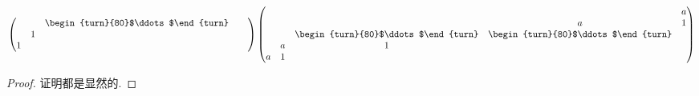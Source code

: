 \documentclass[../../main.tex]{subfiles}
\begin{document}
\begin{lemma}
\begin{align*}
\begin{pmatrix}
& & \begin{turn}{80}$\ddots$\end{turn} & & \\
& 1 & & & \\
1 & & & &
\end{pmatrix}
\begin{pmatrix}
& & & & a \\
& & & a & 1 \\
& & \begin{turn}{80}$\ddots$\end{turn} & \begin{turn}{80}$\ddots$\end{turn} & \\
& a & 1 & & \\
a & 1 & & &
\end{pmatrix}
\end{align*}
\end{lemma}
\begin{proof}
证明都是显然的.
\end{proof}
\end{document}
